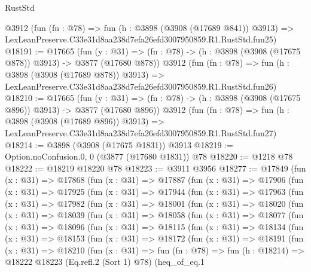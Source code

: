 \begin{lexlean}{RustStd}
\begin{coremodule}
    @3912
    (fun (fn : @78) =>
    fun (h : @3898 (@3908 (@17689 @841)) @3913) =>
    LexLeanPreserve.C33e31d8aa238d7efa26efd3007950859.R1.RustStd.fun25)
@18191 := @17665
    (fun (y : @31) => (fn : @78) -> (h : @3898 (@3908 (@17675 @878)) @3913) -> @3877 (@17680 @878))
    @3912
    (fun (fn : @78) =>
    fun (h : @3898 (@3908 (@17689 @878)) @3913) =>
    LexLeanPreserve.C33e31d8aa238d7efa26efd3007950859.R1.RustStd.fun26)
@18210 := @17665
    (fun (y : @31) => (fn : @78) -> (h : @3898 (@3908 (@17675 @896)) @3913) -> @3877 (@17680 @896))
    @3912
    (fun (fn : @78) =>
    fun (h : @3898 (@3908 (@17689 @896)) @3913) =>
    LexLeanPreserve.C33e31d8aa238d7efa26efd3007950859.R1.RustStd.fun27)
@18214 := @3898 (@3908 (@17675 @1831)) @3913
@18219 := Option.noConfusion.{0, 0} (@3877 (@17680 @1831)) @78
@18220 := @1218 @78
@18222 := @18219 @18220 @78
@18223 := @3911 @3956
@18277 := @17849
    (fun (x : @31) =>
    @17868
      (fun (x : @31) =>
      @17887
        (fun (x : @31) =>
        @17906
          (fun (x : @31) =>
          @17925
            (fun (x : @31) =>
            @17944
              (fun (x : @31) =>
              @17963
                (fun (x : @31) =>
                @17982
                  (fun (x : @31) =>
                  @18001
                    (fun (x : @31) =>
                    @18020
                      (fun (x : @31) =>
                      @18039
                        (fun (x : @31) =>
                        @18058
                          (fun (x : @31) =>
                          @18077
                            (fun (x : @31) =>
                            @18096
                              (fun (x : @31) =>
                              @18115
                                (fun (x : @31) =>
                                @18134
                                  (fun (x : @31) =>
                                  @18153
                                    (fun (x : @31) =>
                                    @18172
                                      (fun (x : @31) =>
                                      @18191
                                        (fun (x : @31) =>
                                        @18210
                                          (fun (x : @31) =>
                                          fun (fn : @78) =>
                                          fun (h : @18214) =>
                                          @18222
                                            @18223
                                            (Eq.refl.{2} (Sort 1) @78)
                                            (heq_of_eq.{1}

\end{coremodule}
\end{lexlean}
